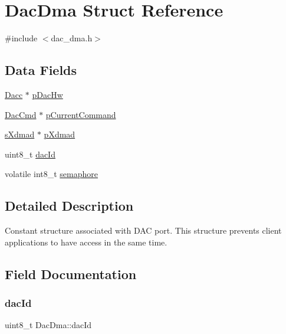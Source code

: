 \hypertarget{structDacDma}{}\section{Dac\+Dma Struct Reference}
\label{structDacDma}


{\ttfamily \#include $<$dac\+\_\+dma.\+h$>$}

\subsection*{Data Fields}
\begin{DoxyCompactItemize}
\item 
\mbox{\hyperlink{structDacc}{Dacc}} $\ast$ \mbox{\hyperlink{structDacDma_a95f0888a58dcbe0052b06c77e81cf463}{p\+Dac\+Hw}}
\item 
\mbox{\hyperlink{structDacCmd}{Dac\+Cmd}} $\ast$ \mbox{\hyperlink{structDacDma_a9646e774687b6318934ebc055bc63c40}{p\+Current\+Command}}
\item 
\mbox{\hyperlink{group__dmad__structs_gaf2c13151514615a6beb35c0d868a5053}{s\+Xdmad}} $\ast$ \mbox{\hyperlink{structDacDma_a1c31f372640b82948dafbf765e6d957b}{p\+Xdmad}}
\item 
uint8\+\_\+t \mbox{\hyperlink{structDacDma_a04fcbea0d17de0c405545a67aee25f14}{dac\+Id}}
\item 
volatile int8\+\_\+t \mbox{\hyperlink{structDacDma_a88d08cd6eaaace55965d20ca53c4a5a4}{semaphore}}
\end{DoxyCompactItemize}


\subsection{Detailed Description}
Constant structure associated with D\+AC port. This structure prevents client applications to have access in the same time. 

\subsection{Field Documentation}
\mbox{\label{structDacDma_a04fcbea0d17de0c405545a67aee25f14}} 
\subsubsection{\texorpdfstring{dacId}{dacId}}
{\footnotesize\ttfamily uint8\+\_\+t Dac\+Dma\+::dac\+Id}

